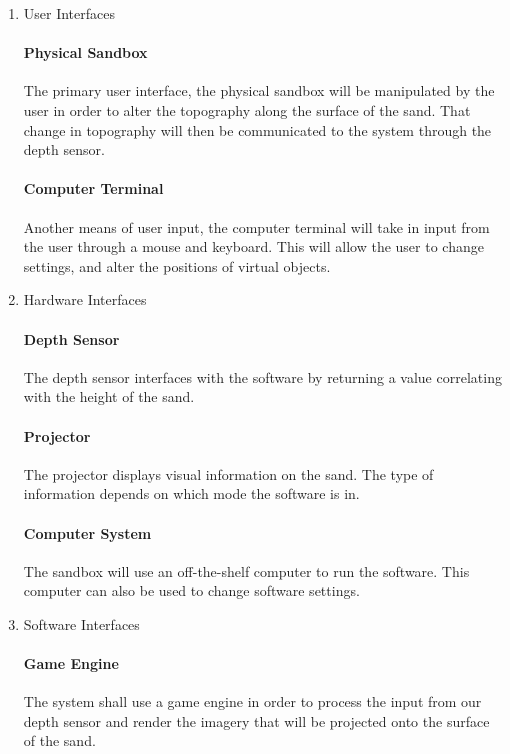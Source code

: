 \begin{enumerate} 
\item{User Interfaces}

\paragraph{Physical Sandbox}
The primary user interface, the physical sandbox will be manipulated by the user in order to alter the topography along the surface of the sand.  That change in topography will then be communicated to the system through the depth sensor.

\paragraph{Computer Terminal}
Another means of user input, the computer terminal will take in input from the user through a mouse and keyboard.  This will allow the user to change settings, and alter the positions of virtual objects.

\item{Hardware Interfaces}
\paragraph{Depth Sensor}
The depth sensor interfaces with the software by returning a value correlating with the height of the sand.
\paragraph{Projector}
The projector displays visual information on the sand. The type of information depends on which mode the software is in.
\paragraph{Computer System}
The sandbox will use an off-the-shelf computer to run the software. This computer can also be used to change software settings.

\item{Software Interfaces}
\paragraph{Game Engine}
The system shall use a game engine in order to process the input from our depth sensor and render the imagery that will be projected onto the surface of the sand.  
\end{enumerate}
